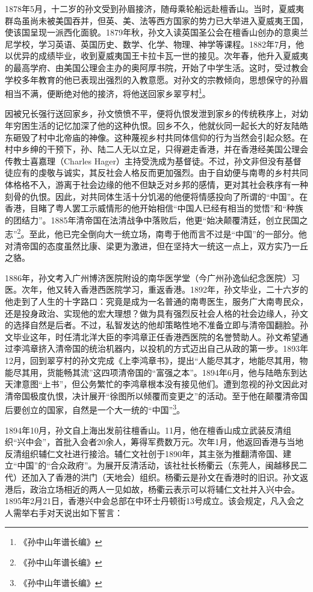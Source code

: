 1878年5月，十二岁的孙文受到孙眉接济，随母乘轮船远赴檀香山。当时，夏威夷群岛虽尚未被美国吞并，但英、美、法等西方国家的势力已大举进入夏威夷王国，使该国呈现一派西化面貌。1879年秋，孙文入读英国圣公会在檀香山创办的意奥兰尼学校，学习英语、英国历史、数学、化学、物理、神学等课程。1882年7月，他以优异的成绩毕业，收到夏威夷国王卡拉卡瓦一世的接见。次年春，他升入夏威夷的最高学府、由美国公理会主办的奥阿厚书院，开始了中学生活。这时，受过教会学校多年教育的他已表现出强烈的入教意愿。对孙文的宗教倾向，思想保守的孙眉相当不满，便断绝对他的接济，将他送回家乡翠亨村\footnote{《孙中山年谱长编》}。

因被兄长强行送回家乡，孙文愤愤不平，便将仇恨发泄到家乡的传统秩序上，对幼年穷困生活的记忆加深了他的这种仇恨。回乡不久，他就伙同一起长大的好友陆皓东砸毁了村中北帝庙的神像。这种蔑视乡村共同体信仰的行为当然会引起众怒。在村中乡绅的干预下，孙、陆二人无以立足，只得避走香港，并在香港经美国公理会传教士喜嘉理（Charles Hager）主持受洗成为基督徒。不过，孙文非但没有基督徒应有的虔敬与诚实，其反社会人格反而更加强烈。由于自幼便与南粤的乡村共同体格格不入，游离于社会边缘的他不但缺乏对乡邦的感情，更对其社会秩序有一种刻骨的仇恨。因此，对共同体生活十分饥渴的他便将情感投向了所谓的“中国”。在香港，目睹了粤人罢工示威情形的他开始相信“中国人已经有相当的觉悟”和“种族的团结力”。1885年清帝国在法清战争中落败后，他更“始决颠覆清廷，创立民国之志”\footnote{《孙中山年谱长编》}。至此，他已完全倒向大一统立场，南粤于他而言不过是“中国”的一部分。他对清帝国的态度虽然比康、梁更为激进，但在坚持大一统这一点上，双方实乃一丘之貉。

1886年，孙文考入广州博济医院附设的南华医学堂（今广州孙逸仙纪念医院）习医。次年，他又转入香港西医院学习，重返香港。1892年，孙文毕业，二十六岁的他走到了人生的十字路口：究竟是成为一名普通的南粤医生，服务广大南粤民众，还是投身政治、实现他的宏大理想？做为具有强烈反社会人格的社会边缘人，孙文的选择自然是后者。不过，私智发达的他却策略性地不准备立即与清帝国翻脸。孙文毕业这年，时任清北洋大臣的李鸿章正任香港西医院的名誉赞助人。孙文希望通过李鸿章挤入清帝国的统治机器内，以投机的方式迈出自己从政的第一步。1893年12月，回到翠亨村的孙文完成《上李鸿章书》，提出“人能尽其才，地能尽其用，物能尽其用，货能畅其流”这四项清帝国的“富强之本”。1894年6月，他与陆皓东到达天津意图“上书”，但公务繁忙的李鸿章根本没有接见他们。遭到忽视的孙文因此对清帝国极度仇恨，决计展开“徐图所以倾覆而变更之”的活动。至于他在颠覆清帝国后要创立的国家，自然是一个大一统的“中国”\footnote{《孙中山年谱长编》}。

1894年10月，孙文自上海出发前往檀香山。11月，他在檀香山成立武装反清组织“兴中会”，首批入会者20余人，筹得军费数万元。次年1月，他返回香港与当地反清组织辅仁文社进行接洽。辅仁文社创于1890年，其主张为推翻清帝国、建立“中国”的“合众政府”。为展开反清活动，该社社长杨衢云（东莞人，闽越移民二代）还加入了香港的洪门（天地会）组织。杨衢云是孙文在香港时的旧识。孙文返港后，政治立场相近的两人一见如故，杨衢云表示可以将辅仁文社并入兴中会。1895年2月21日，香港兴中会总部在中环士丹顿街13号成立。该会规定，凡入会之人需举右手对天说出如下誓言：

